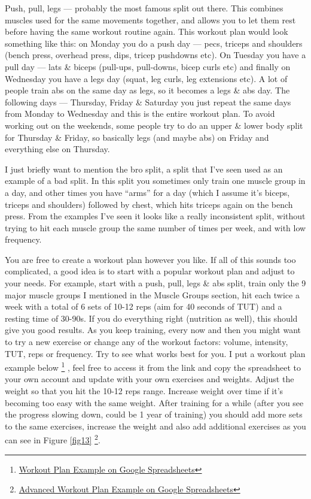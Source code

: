 \documentclass[openany, 12pt]{book}
\begin{document}
        Push, pull, legs --- probably the most famous split out there. This combines muscles used for the same movements together, and allows you to let them rest before having the same
        workout routine again. This workout plan would look something like this: on Monday you do a push day --- pecs, triceps and shoulders (bench press, overhead press, dips, tricep pushdowns etc).
        On Tuesday you have a pull day --- lats \& biceps (pull-ups, pull-downs, bicep curls etc) and finally on Wednesday you have a legs day (squat, leg curls, leg extensions etc). A lot of people
        train abs on the same day as legs, so it becomes a legs \& abs day. The following days --- Thursday, Friday \& Saturday you just repeat the same days from Monday to Wednesday and this is the
        entire workout plan. To avoid working out on the weekends, some people try to do an upper \& lower body split for Thursday \& Friday, so basically legs (and maybe abs) on Friday and everything
        else on Thursday. 

        I just briefly want to mention the bro split, a split that I've seen used as an example of a bad split. In this split you sometimes only train one muscle group in a day, and other times you
        have ``arms'' for a day (which I assume it's biceps, triceps and shoulders) followed by chest, which hits triceps again on the bench press. From the examples I've seen it looks like a really
        inconsistent split, without trying to hit each muscle group the same number of times per week, and with low frequency.
        
        You are free to create a workout plan however you like. If all of this sounds too complicated, a good idea is to start with a popular workout plan and adjust to your needs. For example, start
        with a push, pull, legs \& abs split, train only the 9 major muscle groups I mentioned in the Muscle Groups section, hit each twice a week with a total of 6 sets of 10-12 reps
        (aim for 40 seconds of TUT) and a resting time of 30-90s. If you do
        everything right (nutrition as well), this should give you good results. As you keep training, every now and then you might want to try a new exercise or change any of the workout factors:
        volume, intensity, TUT, reps or frequency. Try to see what works best for you.
        I put a workout plan example below
        \footnote{\href{https://docs.google.com/spreadsheets/d/10_J9RkAH8QSpqSg65c3OfkovorFkVoU3Bl213Y9xWUo/edit}{Workout Plan Example on Google Spreadsheets}}
        , feel
        free to access it from the link and copy the spreadsheet to your own account and update with your own exercises and weights. Adjust the weight so that you hit the 10-12 reps range.
        Increase weight over time if it's becoming too easy with the same weight. After training for a while (after you see the progress slowing down, could be 1 year of training)
        you should add more sets to the same exercises, increase the weight and also add additional exercises as you can see in Figure \ref{fig13}
        \footnote{\href{https://docs.google.com/spreadsheets/d/1A1-G2KrdD_O9NgyKty6OGyuEq619M2QIW6Ple3kbSSI/edit}{Advanced Workout Plan Example on Google Spreadsheets}}.
\end{document}
